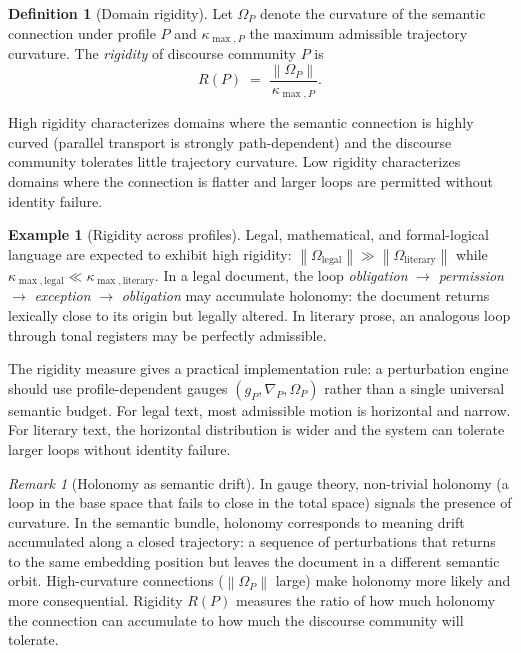 \documentclass[12pt, a4paper]{article}
\theoremstyle{plain}
\theoremstyle{definition}
\newtheorem{definition}[theorem]{Definition}
\newtheorem{example}[theorem]{Example}
\theoremstyle{remark}
\newtheorem{remark}[theorem]{Remark}
\newcommand{\norm}[1]{\left\lVert #1 \right\rVert}
\newcommand{\connD}{\nabla}
\newcommand{\curv}{\Omega}
\begin{document}
\begin{definition}[Domain rigidity]
\label{def:rigidity}
Let $\curv_P$ denote the curvature of the semantic connection under profile $P$
and $\kappa_{\max,P}$ the maximum admissible trajectory curvature.  The
\emph{rigidity} of discourse community $P$ is
\[
   R(P) \;=\; \frac{\norm{\curv_P}}{\kappa_{\max,P}}.
\]
\end{definition}

High rigidity characterizes domains where the semantic connection is highly
curved (parallel transport is strongly path-dependent) and the discourse
community tolerates little trajectory curvature.  Low rigidity characterizes
domains where the connection is flatter and larger loops are permitted without
identity failure.

\begin{example}[Rigidity across profiles]
Legal, mathematical, and formal-logical language are expected to exhibit high
rigidity: $\norm{\curv_{\mathrm{legal}}} \gg \norm{\curv_{\mathrm{literary}}}$
while $\kappa_{\max,\mathrm{legal}} \ll \kappa_{\max,\mathrm{literary}}$.
In a legal document, the loop
\emph{obligation} $\to$ \emph{permission} $\to$ \emph{exception} $\to$
\emph{obligation}
may accumulate holonomy: the document returns lexically close to its origin
but legally altered.  In literary prose, an analogous loop through tonal
registers may be perfectly admissible.
\end{example}

The rigidity measure gives a practical implementation rule: a perturbation
engine should use profile-dependent gauges $(g_P, \connD_P, \curv_P)$ rather
than a single universal semantic budget.  For legal text, most admissible motion
is horizontal and narrow.  For literary text, the horizontal distribution is
wider and the system can tolerate larger loops without identity failure.

\begin{remark}[Holonomy as semantic drift]
In gauge theory, non-trivial holonomy (a loop in the base space that fails to
close in the total space) signals the presence of curvature.  In the semantic
bundle, holonomy corresponds to meaning drift accumulated along a closed
trajectory: a sequence of perturbations that returns to the same embedding
position but leaves the document in a different semantic orbit.  High-curvature
connections ($\norm{\curv_P}$ large) make holonomy more likely and more
consequential.  Rigidity $R(P)$ measures the ratio of how much holonomy the
connection can accumulate to how much the discourse community will tolerate.
\end{remark}
\end{document}
